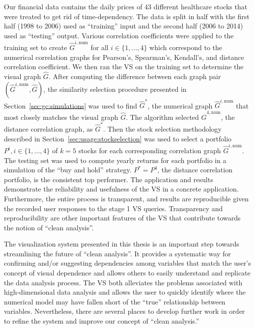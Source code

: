 Our financial data contains the daily prices of 43 different healthcare 
stocks that were treated to get rid of time-dependency. The data is split in 
half with the first half (1998 to 2006) used as ``training'' input and the 
second half (2006 to 2014) used as ``testing'' output. Various correlation 
coefficients were applied to the training set to create 
$\hat{G}^{i,\text{num}}$ for 
all $i \in \{1,...,4\}$ which correspond to the numerical correlation graphs 
for Pearson's, Spearman's, Kendall's, and distance correlation coefficient. We 
then ran the VS on the training set to determine the visual graph $\hat{G}$. 
After computing the difference between each graph pair 
$(\hat{G}^{i,\text{num}},\hat{G})$, the similarity selection procedure 
presented in Section~\ref{sec:gc:simulations} was used to find $\hat{G}^*$, the 
numerical graph $\hat{G}^{i,\text{num}}$ that most closely matches the visual 
graph $\hat{G}$. The algorithm selected $\hat{G}^{4,\text{num}}$, the distance 
correlation graph, as $\hat{G}^*$. 
Then the stock selection methodology described in 
Section~\ref{sec:usage:stockselection} was used to select a portfolio $P^i, i 
\in \{1,...,4\}$ of $k = 5$ stocks for each corresponding correlation graph 
$\hat{G}^{i,\text{num}}$. 
The testing set was used to compute yearly returns for each portfolio in a 
simulation of the ``buy and hold'' strategy. $P^* = P^4$, the 
distance correlation portfolio, is the consistent top performer. The 
application and results demonstrate the reliability and usefulness of the VS in 
a concrete application. Furthermore, the entire process is  
transparent, and results are reproducible given the recorded user responses 
to the stage 1 VS queries. Transparency and reproducibility are 
other important features of the VS that contribute towards the notion of 
``clean analysis''.

The visualization system presented in this thesis is an important step towards
streamlining the future of ``clean analysis''. It provides a systematic way for 
confirming and/or suggesting dependencies among variables that match the user's 
concept of visual dependence and allows others to easily understand and 
replicate the data analysis process. The VS both 
alleviates the problems associated with high-dimensional data analysis and 
allows the user to quickly identify where the numerical model may have fallen 
short of the ``true'' relationship between variables. Nevertheless, there are 
several places to develop further work in order to refine the system and 
improve our concept of ``clean analysis.''